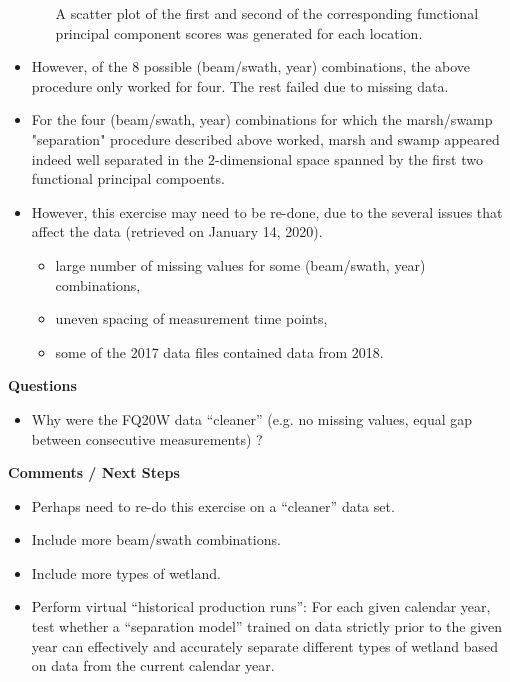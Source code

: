 \begin{itemize}
\begin{itemize}
		A scatter plot of the first and second of the corresponding
		functional principal component scores was generated for each location. 
	\end{itemize}
\item
	However, of the $8$ possible (beam/swath, year) combinations,
	the above procedure only worked for four. The rest failed due to missing data.
\item
	For the four (beam/swath, year) combinations for which the marsh/swamp "separation" procedure
	described above worked, marsh and swamp appeared indeed well separated
	in the $2$-dimensional space spanned by the first two functional principal compoents.
\item
	However, this exercise may need to be re-done, due to the several issues that
	affect the data (retrieved on January 14, 2020).
	\begin{itemize}
	\item
		large number of missing values for some (beam/swath, year) combinations,
	\item
		uneven spacing of measurement time points,
	\item
		some of the 2017 data files contained data from 2018.
	\end{itemize}
\end{itemize}


\vskip 0.5cm
\noindent
\textbf{Questions}
\begin{itemize}
\item
	Why were the FQ20W data ``cleaner'' (e.g. no missing values, equal gap between consecutive measurements) ?
\end{itemize}


\vskip 0.5cm
\noindent
\textbf{Comments / Next Steps}
\begin{itemize}
\item
	Perhaps need to re-do this exercise on a ``cleaner'' data set.
\item
	Include more beam/swath combinations.
\item
	Include more types of wetland.
\item
	Perform virtual ``historical production runs'': 
	For each given calendar year, test whether a ``separation model''
	trained on data strictly prior to the given year can effectively and accurately separate
	different types of wetland based on data from the current calendar year.
\end{itemize}


\renewcommand{\theenumi}{\roman{enumi}}
\renewcommand{\labelenumi}{\textnormal{(\theenumi)}$\;\;$}

